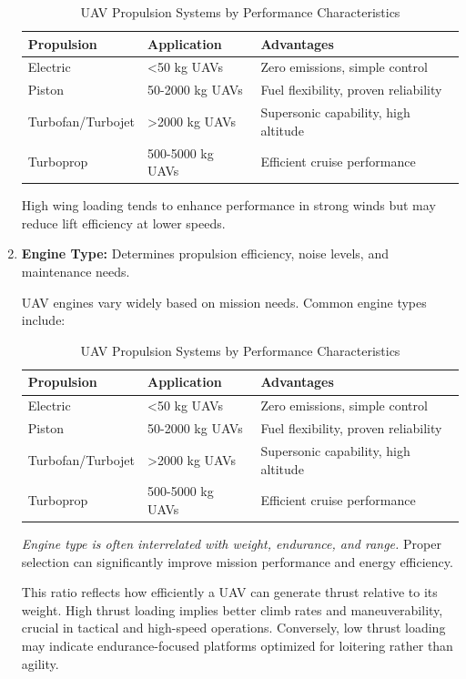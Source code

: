 \begin{enumerate}
    \begin{table}[h]
        \centering
        \label{tab:uav_propulsion}
        \begin{tabular}{|l|l|l|}
        \hline
        \textbf{Propulsion} & \textbf{Application} & \textbf{Advantages} \\ \hline
        Electric & <50 kg UAVs & Zero emissions, simple control \\ \hline
        Piston & 50-2000 kg UAVs & Fuel flexibility, proven reliability \\ \hline
        Turbofan/Turbojet & >2000 kg UAVs & Supersonic capability, high altitude \\ \hline
        Turboprop & 500-5000 kg UAVs & Efficient cruise performance \\ \hline
        \end{tabular}
        \caption{UAV Propulsion Systems by Performance Characteristics}
    \end{table}

    High wing loading tends to enhance performance in strong winds but may reduce lift efficiency at lower speeds.

    \item \textbf{Engine Type:} Determines propulsion efficiency, noise levels, and maintenance needs.

    UAV engines vary widely based on mission needs. Common engine types include:

    \begin{table}[h]
        \centering
        \label{tab:uav_propulsion}
        \begin{tabular}{|l|l|l|}
        \hline
        \textbf{Propulsion} & \textbf{Application} & \textbf{Advantages} \\ \hline
        Electric & <50 kg UAVs & Zero emissions, simple control \\ \hline
        Piston & 50-2000 kg UAVs & Fuel flexibility, proven reliability \\ \hline
        Turbofan/Turbojet & >2000 kg UAVs & Supersonic capability, high altitude \\ \hline
        Turboprop & 500-5000 kg UAVs & Efficient cruise performance \\ \hline
        \end{tabular}
        \caption{UAV Propulsion Systems by Performance Characteristics}
    \end{table}

    \textit{Engine type is often interrelated with weight, endurance, and range.} Proper selection can significantly improve mission performance and energy efficiency.


    This ratio reflects how efficiently a UAV can generate thrust relative to its weight. High thrust loading implies better climb rates and maneuverability, crucial in tactical and high-speed operations. Conversely, low thrust loading may indicate endurance-focused platforms optimized for loitering rather than agility.
\end{enumerate}

